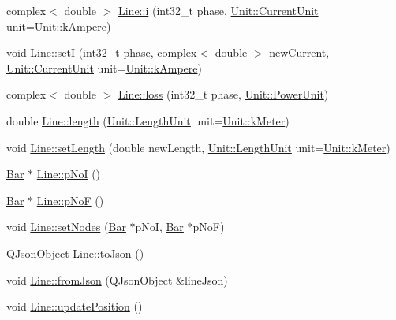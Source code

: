 \begin{DoxyCompactItemize}
\item 
complex$<$ double $>$ \hyperlink{group___models_gaf81e7055102816465bdf7e19afc2d547}{Line\+::i} (int32\+\_\+t phase, \hyperlink{class_unit_a0794cf6c9682f48296dd4a5315389787}{Unit\+::\+Current\+Unit} unit=\hyperlink{class_unit_a0794cf6c9682f48296dd4a5315389787a368a3c470f0b590a6100dda717a7dd4f}{Unit\+::k\+Ampere})
\item 
void \hyperlink{group___models_ga9e55b06dc3e385838fdd13d5580438ef}{Line\+::set\+I} (int32\+\_\+t phase, complex$<$ double $>$ new\+Current, \hyperlink{class_unit_a0794cf6c9682f48296dd4a5315389787}{Unit\+::\+Current\+Unit} unit=\hyperlink{class_unit_a0794cf6c9682f48296dd4a5315389787a368a3c470f0b590a6100dda717a7dd4f}{Unit\+::k\+Ampere})
\item 
complex$<$ double $>$ \hyperlink{group___models_ga7909d69e419de3f460ca7abab3d91e53}{Line\+::loss} (int32\+\_\+t phase, \hyperlink{class_unit_ace265ae255370ccacfd5370337572c3b}{Unit\+::\+Power\+Unit})
\item 
double \hyperlink{group___models_gae2e4500d0fa60dcc2ecb08b2c96954f9}{Line\+::length} (\hyperlink{class_unit_a8c8921f7b225ad6063b1cb573425b9a0}{Unit\+::\+Length\+Unit} unit=\hyperlink{class_unit_a8c8921f7b225ad6063b1cb573425b9a0abfa41ebe7ee649a1f02c9b8ae570434b}{Unit\+::k\+Meter})
\item 
void \hyperlink{group___models_ga950d0b8f5d167eda430c65ca7adadbb0}{Line\+::set\+Length} (double new\+Length, \hyperlink{class_unit_a8c8921f7b225ad6063b1cb573425b9a0}{Unit\+::\+Length\+Unit} unit=\hyperlink{class_unit_a8c8921f7b225ad6063b1cb573425b9a0abfa41ebe7ee649a1f02c9b8ae570434b}{Unit\+::k\+Meter})
\item 
\hyperlink{class_bar}{Bar} $\ast$ \hyperlink{group___models_gaeafd90e84ac2f8de2a879abe9e53eef3}{Line\+::p\+No\+I} ()
\item 
\hyperlink{class_bar}{Bar} $\ast$ \hyperlink{group___models_gabbc73ddedd3075c33ae5331bd7c9829f}{Line\+::p\+No\+F} ()
\item 
void \hyperlink{group___models_gaeeab146e6c1d7d1a688a2764a9c9a170}{Line\+::set\+Nodes} (\hyperlink{class_bar}{Bar} $\ast$p\+No\+I, \hyperlink{class_bar}{Bar} $\ast$p\+No\+F)
\item 
Q\+Json\+Object \hyperlink{group___models_ga4effa7a96db465ea6e01135d5a010739}{Line\+::to\+Json} ()
\item 
void \hyperlink{group___models_ga62623ad71df5279377cc69da90decc75}{Line\+::from\+Json} (Q\+Json\+Object \&line\+Json)
\item 
void \hyperlink{group___models_ga8fdb12651d4bc592616d241386b066b3}{Line\+::update\+Position} ()

\end{DoxyCompactItemize}
